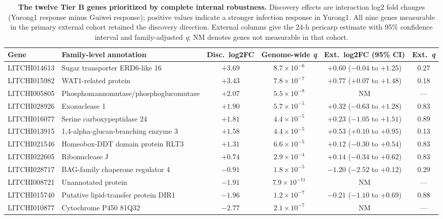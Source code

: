 \documentclass[referee,pdflatex,sn-basic,Numbered]{sn-jnl}
\newcommand{\q}{\textit{q}}
\begin{document}
\begin{table}[htbp]
\centering
\caption{\textbf{The twelve Tier B genes prioritized by complete internal robustness.} Discovery effects are interaction log2 fold changes (Yurong1 response minus Guiwei response); positive values indicate a stronger infection response in Yurong1. All nine genes measurable in the primary external cohort retained the discovery direction. External columns give the 24-h pericarp estimate with 95\% confidence interval and family-adjusted \q; NM denotes genes not measurable in that cohort.}
\label{tab:tierb}
\footnotesize
\setlength{\tabcolsep}{3pt}
\begin{tabular}{@{}llcccc@{}}
\toprule
\textbf{Gene} & \textbf{Family-level annotation} & \textbf{Disc.\ log2FC} & \textbf{Genome-wide \q} & \textbf{Ext.\ log2FC (95\% CI)} & \textbf{Ext.\ \q} \\
\midrule
LITCHI014613 & Sugar transporter ERD6-like 16 & $+3.69$ & $8.7\times10^{-6}$ & $+0.60$ ($-0.04$ to $+1.25$) & 0.27 \\
LITCHI015982 & WAT1-related protein & $+3.43$ & $7.8\times10^{-7}$ & $+0.77$ ($+0.07$ to $+1.48$) & 0.18 \\
LITCHI005805 & Phosphomannomutase/phosphoglucomutase & $+2.07$ & $5.5\times10^{-8}$ & NM & --- \\
LITCHI028926 & Exonuclease 1 & $+1.90$ & $5.7\times10^{-5}$ & $+0.32$ ($-0.63$ to $+1.28$) & 0.83 \\
LITCHI016077 & Serine carboxypeptidase 24 & $+1.81$ & $4.4\times10^{-5}$ & $+0.23$ ($-1.05$ to $+1.51$) & 0.89 \\
LITCHI013915 & 1,4-alpha-glucan-branching enzyme 3 & $+1.58$ & $4.4\times10^{-5}$ & $+0.53$ ($+0.10$ to $+0.95$) & 0.13 \\
LITCHI021546 & Homeobox-DDT domain protein RLT3 & $+1.31$ & $6.6\times10^{-5}$ & $+0.12$ ($-0.30$ to $+0.54$) & 0.83 \\
LITCHI022605 & Ribonuclease J & $+0.74$ & $2.9\times10^{-4}$ & $+0.14$ ($-0.34$ to $+0.62$) & 0.83 \\
LITCHI028717 & BAG-family chaperone regulator 4 & $-0.91$ & $1.8\times10^{-5}$ & $-1.20$ ($-2.52$ to $+0.12$) & 0.29 \\
LITCHI008721 & Unannotated protein & $-1.91$ & $7.9\times10^{-11}$ & NM & --- \\
LITCHI015740 & Putative lipid-transfer protein DIR1 & $-1.96$ & $1.2\times10^{-7}$ & $-0.21$ ($-1.10$ to $+0.69$) & 0.88 \\
LITCHI010877 & Cytochrome P450 81Q32 & $-2.77$ & $2.1\times10^{-7}$ & NM & --- \\
\bottomrule
\end{tabular}
\end{table}
\end{document}
